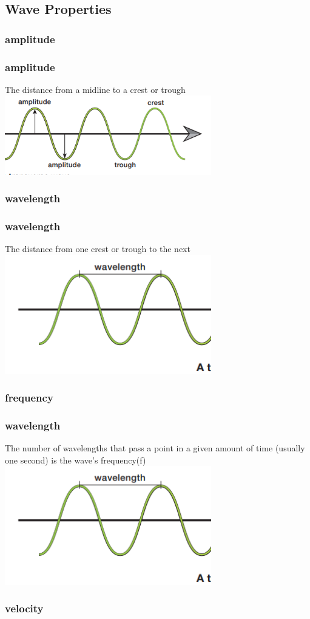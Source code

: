 \documentclass{beamer}
\begin{document}
\subsection{Wave Properties}

\subsubsection{amplitude}

\begin{frame}
    \frametitle{amplitude}
    \pause The distance from a midline to a crest or trough
    \includegraphics[width=9cm]{../../../../public/amplitude.png}
\end{frame}

\subsubsection{wavelength}

\begin{frame}
    \frametitle{wavelength}
    \pause The distance from one crest or trough to the next
    \includegraphics[width=9cm]{../../../../public/wavelength.png}
\end{frame}

\subsubsection{frequency}

\begin{frame}
    \frametitle{wavelength}
    \pause  The number of wavelengths that pass a point in a given amount of time (usually one second) is the wave's frequency(f)
    \includegraphics[width=9cm]{../../../../public/wavelength.png}
\end{frame}




\subsubsection{velocity}
\end{document}
